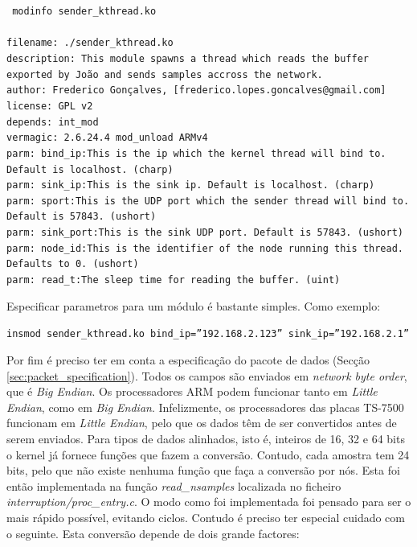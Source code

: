 \documentclass[10pt,a4paper,oneside]{book}
\begin{document}
    \begin{flushleft}
      {\tt 
        modinfo sender\_kthread.ko\\\hfill\\
        filename:       ./sender\_kthread.ko\\
        description:    This module spawns a thread which reads the buffer exported by João and
                        sends samples accross the network.\\
        author:         Frederico Gonçalves, [frederico.lopes.goncalves@gmail.com]\\
        license:        GPL v2\\
        depends:        int\_mod\\
        vermagic:       2.6.24.4 mod\_unload ARMv4 \\
        parm:           bind\_ip:This is the ip which the kernel thread will bind to. Default is localhost. (charp)\\
        parm:           sink\_ip:This is the sink ip. Default is localhost. (charp)\\
        parm:           sport:This is the UDP port which the sender thread will bind to. Default is 57843. (ushort)\\
        parm:           sink\_port:This is the sink UDP port. Default is 57843. (ushort)\\
        parm:           node\_id:This is the identifier of the node running this thread. Defaults to 0. (ushort)\\
        parm:           read\_t:The sleep time for reading the buffer. (uint)
      }
    \end{flushleft}

    Especificar parametros para um módulo é bastante simples. Como exemplo:

    \begin{flushleft}
      {\tt insmod sender\_kthread.ko bind\_ip=''192.168.2.123'' sink\_ip=''192.168.2.1''}
    \end{flushleft}

    Por fim é preciso ter em conta a especificação do pacote de dados (Secção \ref{sec:packet_specification}). Todos os campos são enviados em \emph{network byte order}, que é \emph{Big Endian}. Os processadores ARM podem funcionar tanto em \emph{Little Endian}, como em \emph{Big Endian}. Infelizmente, os processadores das placas TS-7500 funcionam em \emph{Little Endian}, pelo que os dados têm de ser convertidos antes de serem enviados. Para tipos de dados alinhados, isto é, inteiros de 16, 32 e 64 bits o kernel já fornece funções que fazem a conversão. Contudo, cada amostra tem 24 bits, pelo que não existe nenhuma função que faça a conversão por nós. Esta foi então implementada na função \emph{read\_nsamples} localizada no ficheiro \emph{interruption/proc\_entry.c}. O modo como foi implementada foi pensado para ser o mais rápido possível, evitando ciclos. Contudo é preciso ter especial cuidado com o seguinte. Esta conversão depende de dois grande factores:
\end{document}
